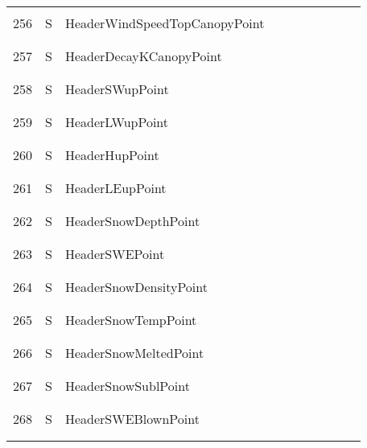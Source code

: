 \begin{longtable}{|c|c|l|c|c|c|c|p{}|c|p{}|}
&&&&&&&&&\\
256 & S & HeaderWindSpeedTopCanopyPoint & & & & & & & \\
&&&&&&&&&\\\hline%
&&&&&&&&&\\
257 & S & HeaderDecayKCanopyPoint & & & & & & & \\
&&&&&&&&&\\\hline%
&&&&&&&&&\\
258 & S & HeaderSWupPoint & & & & & & & \\
&&&&&&&&&\\\hline%
&&&&&&&&&\\
259 & S & HeaderLWupPoint & & & & & & & \\
&&&&&&&&&\\\hline%
&&&&&&&&&\\
260 & S & HeaderHupPoint & & & & & & & \\
&&&&&&&&&\\\hline%
&&&&&&&&&\\
261 & S & HeaderLEupPoint & & & & & & & \\
&&&&&&&&&\\\hline%
&&&&&&&&&\\
262 & S & HeaderSnowDepthPoint & & & & & & & \\
&&&&&&&&&\\\hline%
&&&&&&&&&\\
263 & S & HeaderSWEPoint & & & & & & & \\
&&&&&&&&&\\\hline%
&&&&&&&&&\\
264 & S & HeaderSnowDensityPoint & & & & & & & \\
&&&&&&&&&\\\hline%
&&&&&&&&&\\
265 & S & HeaderSnowTempPoint & & & & & & & \\
&&&&&&&&&\\\hline%
&&&&&&&&&\\
266 & S & HeaderSnowMeltedPoint & & & & & & & \\
&&&&&&&&&\\\hline%
&&&&&&&&&\\
267 & S & HeaderSnowSublPoint & & & & & & & \\
&&&&&&&&&\\\hline%
&&&&&&&&&\\
268 & S & HeaderSWEBlownPoint & & & & & & & \\
&&&&&&&&&\\\hline%
&&&&&&&&&\\

\end{longtable}

